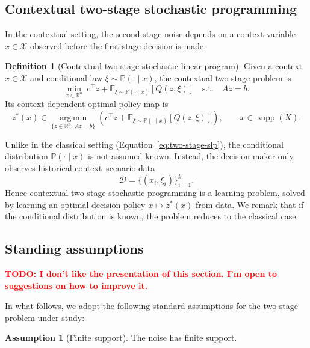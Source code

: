 \documentclass{article}
\newcommand{\R}{\mathbb{R}}
\newcommand{\E}{\mathbb{E}}
\theoremstyle{plain}
\theoremstyle{definition}
\newtheorem{definition}{Definition}
\newtheorem{assumption}{Assumption}
\theoremstyle{remark}
\begin{document}
\subsection{Contextual two-stage stochastic programming}
\label{sec:contextual}
In the contextual setting, the second-stage noise depends on a context variable $x\in\mathcal X$ observed before the first-stage decision is made.

\begin{definition}[Contextual two-stage stochastic linear program]
\label{def:contextual-two-stage-slp}
Given a context $x\in\mathcal X$ and conditional law $\xi\sim\mathbb P(\cdot\mid x)$, the contextual two-stage problem is
\begin{equation}
\label{eq:contextual-two-stage}
\min_{z\in\R^n}\ c^\top z+\E_{\xi\sim\mathbb P(\cdot\mid x)}\!\left[Q(z,\xi)\right]
\quad\text{s.t.}\quad Az=b.
\end{equation}
Its context-dependent optimal policy map is
\begin{equation}
\label{eq:optimal-policy-map}
z^*(x)\in\operatorname*{arg\,min}_{\{z\in\R^n:\,Az=b\}}
\left(c^\top z+\E_{\xi\sim\mathbb P(\cdot\mid x)}\!\left[Q(z,\xi)\right]\right),
\qquad x\in\operatorname{supp}(X).
\end{equation}
\end{definition}

Unlike in the classical setting (Equation~\eqref{eq:two-stage-slp}), the conditional distribution $\mathbb P(\cdot\mid x)$ is not assumed known. Instead, the decision maker only observes historical context--scenario data
\[
\mathcal D=\{(x_i,\xi_i)\}_{i=1}^k.
\]
Hence contextual two-stage stochastic programming is a learning problem, solved by learning an optimal decision policy $x\mapsto z^*(x)$ from data.
We remark that if the conditional distribution is known, the problem reduces to the classical case.

\subsection{Standing assumptions}
\label{sec:standing-assumptions}
\textcolor{red}{\textbf{TODO: I don't like the presentation of this section. I'm open to suggestions on how to improve it.}}

In what follows, we adopt the following standard assumptions for the two-stage problem under study:
\begin{assumption}[Finite support]
\label{ass:finite-support}
The noise has finite support.
\end{assumption}
\end{document}
